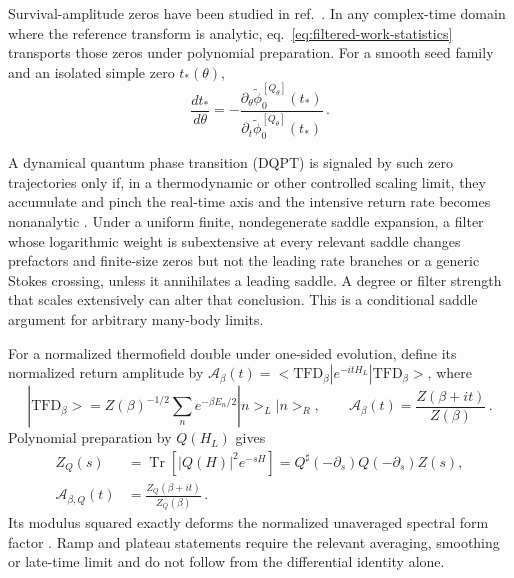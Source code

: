 \documentclass[a4paper,11pt]{article}
\def\ket#1{|#1>}%
\def\bra#1{<#1|}%
\def\dd{d}%
\def\ii{i}%
\def\ee{e}%
\theoremstyle{definition}
\theoremstyle{remark}
\newcommand{\ket}[1]{|#1\rangle}
\newcommand{\bra}[1]{\langle #1|}
\newcommand{\dd}{\mathrm d}
\newcommand{\ii}{\mathrm i}
\newcommand{\ee}{\mathrm e}
\newcommand{\Qsh}{Q^{\sharp}}
\begin{document}
Survival-amplitude zeros have been studied in
ref.~\cite{NovotnyEtAl2026}.  In any complex-time domain where the reference transform is
analytic, eq.~\eqref{eq:filtered-work-statistics} transports those zeros under polynomial
preparation.  For a
smooth seed family and an isolated simple zero $t_*(\theta)$,
\begin{equation}
   \frac{\dd t_*}{\dd\theta}
   =-\frac{\partial_\theta\widetilde\phi_0^{[Q_\theta]}(t_*)}
           {\partial_t\widetilde\phi_0^{[Q_\theta]}(t_*)}\,.
   \label{eq:filtered-zero-response}
\end{equation}

A dynamical quantum phase transition (DQPT) is signaled by such zero trajectories only if,
in a thermodynamic or other controlled scaling limit, they accumulate and pinch the real-time axis
and the intensive return rate becomes nonanalytic
\cite{HeylPolkovnikovKehrein2013,KrylovDQPT2024}.  Under a uniform finite,
nondegenerate saddle expansion, a filter whose logarithmic weight is subextensive at every
relevant saddle changes prefactors and finite-size zeros but not the leading rate branches or a
generic Stokes crossing, unless it annihilates a leading saddle.  A degree or filter strength that
scales extensively can alter that conclusion.  This is a conditional saddle argument for arbitrary many-body limits.

For a normalized thermofield double under one-sided evolution, define
its normalized return amplitude by
$\mathcal A_\beta(t)=\bra{\mathrm{TFD}_\beta}\ee^{-\ii tH_L}\ket{\mathrm{TFD}_\beta}$, where
\begin{equation}
   \ket{\mathrm{TFD}_\beta}
   =Z(\beta)^{-1/2}\sum_n\ee^{-\beta E_n/2}\ket n_L\ket n_R,
   \qquad
   \mathcal A_\beta(t)=\frac{Z(\beta+\ii t)}{Z(\beta)}\,.
   \label{eq:tfd-spectral-form-factor-context}
\end{equation}
Polynomial preparation by $Q(H_L)$ gives
\begin{equation}
\begin{aligned}
   Z_Q(s)&=\operatorname{Tr}\!\left[|Q(H)|^2\ee^{-sH}\right]
   =\Qsh(-\partial_s)Q(-\partial_s)Z(s),\\
   \mathcal A_{\beta,Q}(t)&=\frac{Z_Q(\beta+\ii t)}{Z_Q(\beta)}\,.
\end{aligned}
   \label{eq:filtered-tfd-partition-function}
\end{equation}
Its modulus squared exactly deforms the normalized unaveraged spectral form factor
\cite{DelCampoMolinaVilaplanaSantosSonner2018}.  Ramp and plateau statements require the relevant
averaging, smoothing or late-time limit and do not follow from the differential identity alone.
\end{document}
